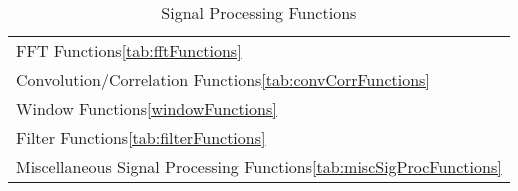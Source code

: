 \begin{table}[H]
\caption{Signal Processing Functions}
\label{tab:signalProcessingFunctions}
\begin{center}
\begin{tabular}{|l|}\hline
FFT Functions\ref{tab:fftFunctions}\\
Convolution/Correlation Functions\ref{tab:convCorrFunctions}\\
Window Functions\ref{windowFunctions}\\
Filter Functions\ref{tab:filterFunctions}\\
Miscellaneous Signal Processing Functions\ref{tab:miscSigProcFunctions}\\
\hline\end{tabular}
\end{center}
\label{default}
\end{table}%